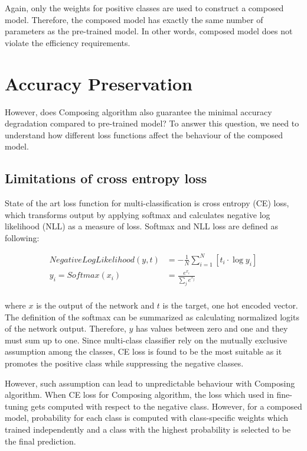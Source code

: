 \documentclass{article}
\begin{document}
Again, only the weights for positive classes are used to construct a composed model. Therefore, the composed model has exactly the same number of parameters as the pre-trained model. In other words, composed model does not violate the efficiency requirements.

\section{Accuracy Preservation}

However, does Composing algorithm also guarantee the minimal accuracy degradation compared to pre-trained model? To answer this question, we need to understand how different loss functions affect the behaviour of the composed model.

\subsection{Limitations of cross entropy loss}

State of the art loss function for multi-classification is cross entropy (CE) loss, which transforms output by applying softmax and calculates negative log likelihood (NLL) as a measure of loss. Softmax and NLL loss are defined as following:

\begin{align*}
NegativeLogLikelihood(y, t) & = -\frac{1}{N}\sum_{i=1}^N \left[ t_i \cdot \log y_i\right] \\
y_i = Softmax(x_i) &= \frac{e^{x_i}}{\sum_{j}e^{x_j}} \\
\end{align*}

where $x$ is the output of the network and $t$ is the target, one hot encoded vector. The definition of the softmax can be summarized as calculating normalized logits of the network output. Therefore, $y$ has values between zero and one and they must sum up to one. Since multi-class classifier rely on the mutually exclusive assumption among the classes, CE loss is found to be the most suitable as it promotes the positive class while suppressing the negative classes.

However, such assumption can lead to unpredictable behaviour with Composing algorithm. When CE loss for Composing algorithm, the loss which used in fine-tuning gets computed with respect to the negative class. However, for a composed model, probability for each class is computed with class-specific weights which trained independently and a class with the highest probability is selected to be the final prediction.
\end{document}
